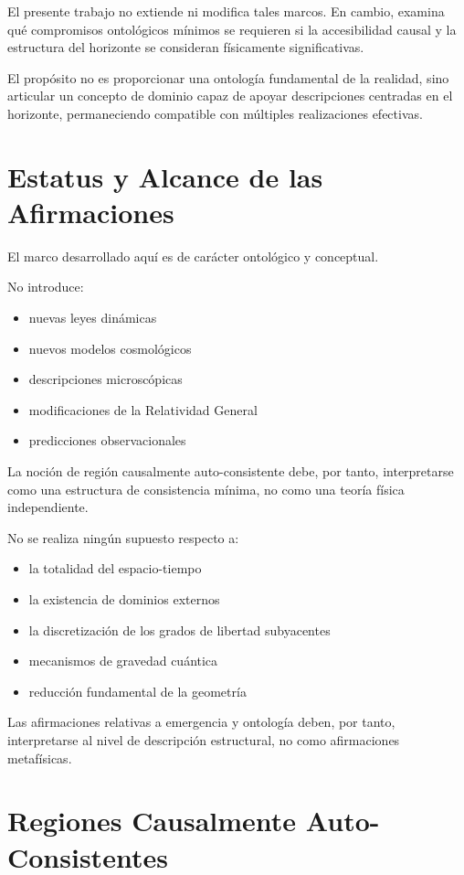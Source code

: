 \documentclass[12pt,a4paper]{article}
\begin{document}
El presente trabajo no extiende ni modifica tales marcos. En cambio, examina qué compromisos ontológicos mínimos se requieren si la accesibilidad causal y la estructura del horizonte se consideran físicamente significativas.

El propósito no es proporcionar una ontología fundamental de la realidad, sino articular un concepto de dominio capaz de apoyar descripciones centradas en el horizonte, permaneciendo compatible con múltiples realizaciones efectivas.

\section{Estatus y Alcance de las Afirmaciones}

El marco desarrollado aquí es de carácter ontológico y conceptual.

No introduce:

\begin{itemize}
  \item nuevas leyes dinámicas
  \item nuevos modelos cosmológicos
  \item descripciones microscópicas
  \item modificaciones de la Relatividad General
  \item predicciones observacionales
\end{itemize}

La noción de región causalmente auto-consistente debe, por tanto, interpretarse como una estructura de consistencia mínima, no como una teoría física independiente.

No se realiza ningún supuesto respecto a:

\begin{itemize}
  \item la totalidad del espacio-tiempo
  \item la existencia de dominios externos
  \item la discretización de los grados de libertad subyacentes
  \item mecanismos de gravedad cuántica
  \item reducción fundamental de la geometría
\end{itemize}

Las afirmaciones relativas a emergencia y ontología deben, por tanto, interpretarse al nivel de descripción estructural, no como afirmaciones metafísicas.

\section{Regiones Causalmente Auto-Consistentes}
\end{document}
